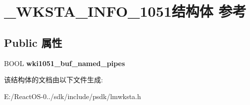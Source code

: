 \hypertarget{struct___w_k_s_t_a___i_n_f_o__1051}{}\section{\+\_\+\+W\+K\+S\+T\+A\+\_\+\+I\+N\+F\+O\+\_\+1051结构体 参考}
\label{struct___w_k_s_t_a___i_n_f_o__1051}
\subsection*{Public 属性}
\begin{DoxyCompactItemize}
\item 
\mbox{\label{struct___w_k_s_t_a___i_n_f_o__1051_a99c31ac3010b37385c3db80901174edd}} 
B\+O\+OL {\bfseries wki1051\+\_\+buf\+\_\+named\+\_\+pipes}
\end{DoxyCompactItemize}


该结构体的文档由以下文件生成\+:\begin{DoxyCompactItemize}
\item 
E\+:/\+React\+O\+S-\/0../sdk/include/psdk/lmwksta.\+h\end{DoxyCompactItemize}
